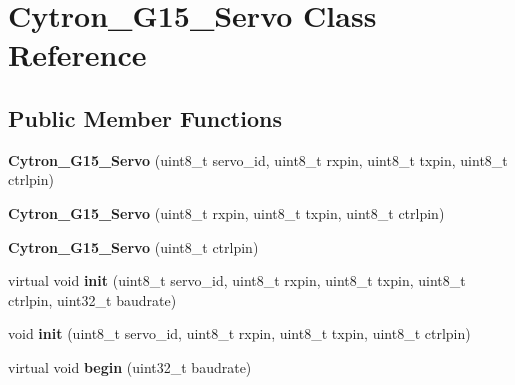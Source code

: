 \hypertarget{classCytron__G15__Servo}{}\section{Cytron\+\_\+\+G15\+\_\+\+Servo Class Reference}
\label{classCytron__G15__Servo}
\subsection*{Public Member Functions}
\begin{DoxyCompactItemize}
\item 
{\bfseries Cytron\+\_\+\+G15\+\_\+\+Servo} (uint8\+\_\+t servo\+\_\+id, uint8\+\_\+t rxpin, uint8\+\_\+t txpin, uint8\+\_\+t ctrlpin)\hypertarget{classCytron__G15__Servo_aaa3bfa9e3a1a5b971f8665f1b90513fa}{}\label{classCytron__G15__Servo_aaa3bfa9e3a1a5b971f8665f1b90513fa}

\item 
{\bfseries Cytron\+\_\+\+G15\+\_\+\+Servo} (uint8\+\_\+t rxpin, uint8\+\_\+t txpin, uint8\+\_\+t ctrlpin)\hypertarget{classCytron__G15__Servo_ada4b9c6d1cf5d84adae77da8950391c7}{}\label{classCytron__G15__Servo_ada4b9c6d1cf5d84adae77da8950391c7}

\item 
{\bfseries Cytron\+\_\+\+G15\+\_\+\+Servo} (uint8\+\_\+t ctrlpin)\hypertarget{classCytron__G15__Servo_ad88800c4a1f68d9fb690d55240bd276d}{}\label{classCytron__G15__Servo_ad88800c4a1f68d9fb690d55240bd276d}

\item 
virtual void {\bfseries init} (uint8\+\_\+t servo\+\_\+id, uint8\+\_\+t rxpin, uint8\+\_\+t txpin, uint8\+\_\+t ctrlpin, uint32\+\_\+t baudrate)\hypertarget{classCytron__G15__Servo_ad99a80c48da7ad7ba969e87c86738599}{}\label{classCytron__G15__Servo_ad99a80c48da7ad7ba969e87c86738599}

\item 
void {\bfseries init} (uint8\+\_\+t servo\+\_\+id, uint8\+\_\+t rxpin, uint8\+\_\+t txpin, uint8\+\_\+t ctrlpin)\hypertarget{classCytron__G15__Servo_af6b5efff7b7c4d780769f513de5bda84}{}\label{classCytron__G15__Servo_af6b5efff7b7c4d780769f513de5bda84}

\item 
virtual void {\bfseries begin} (uint32\+\_\+t baudrate)\hypertarget{classCytron__G15__Servo_abf8042209ec229112f06c15f039d39b6}{}\label{classCytron__G15__Servo_abf8042209ec229112f06c15f039d39b6}


\end{DoxyCompactItemize}
